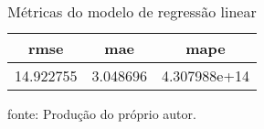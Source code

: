 \begin{table}
\centering
\caption{Métricas do modelo de regressão linear}
\label{tab:lin_metrics}
\begin{tabular}{ccc}
\toprule
     rmse &      mae &         mape \\
\midrule
14.922755 & 3.048696 & 4.307988e+14 \\
\bottomrule
\end{tabular}
\par
{\small fonte: Produção do próprio autor.}
\end{table}
